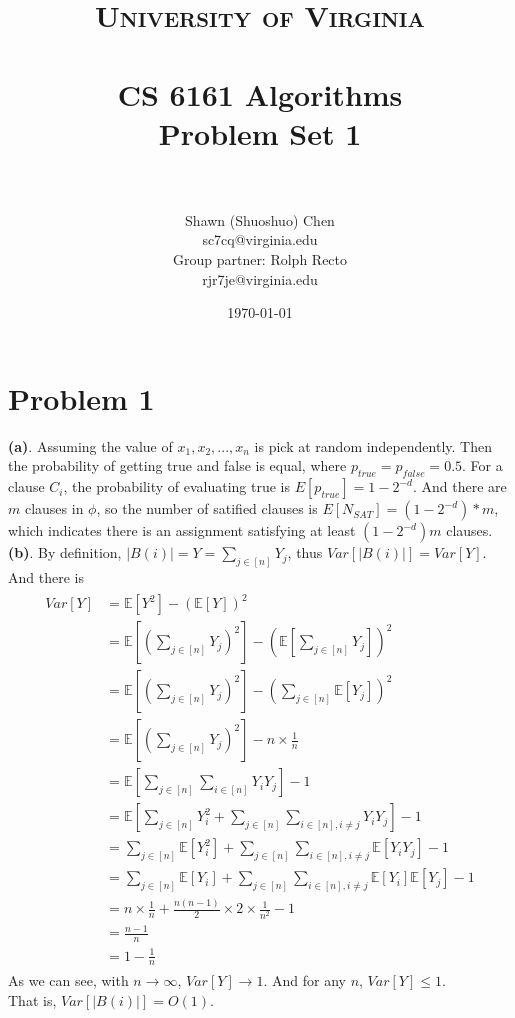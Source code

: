 \documentclass[titlepage, paper=a4, fontsize=11pt]{scrartcl} %
\title{	
\normalfont \normalsize 
\textsc{University of Virginia} \\ [25pt] %
\horrule{0.5pt} \\[0.4cm] %
\huge CS 6161 Algorithms \\
\huge Problem Set 1 \\ %
\horrule{2pt} \\[0.5cm] %
}
\author{Shawn (Shuoshuo) Chen\\sc7cq@virginia.edu\\Group partner: Rolph Recto\\ rjr7je@virginia.edu} %
\date{\normalsize\today} %
\numberwithin{equation}{section} %
\numberwithin{figure}{section} %
\numberwithin{table}{section} %
\begin{document}
\maketitle %


\section*{Problem 1}
\textbf{(a)}.
Assuming the value of ${x_1,x_2, ... ,x_n}$ is pick at random independently. Then the probability of getting true
and false is equal, where $p_{true} = p_{false} = 0.5$. For a clause $C_i$, the probability of evaluating true is
$E[p_{true}] = 1-2^{-d}$. And there are $m$ clauses in $\phi$, so the number of satified clauses is
$E[N_{SAT}] = (1-2^{-d}) * m$, which indicates there is an assignment satisfying at least $(1-2^{-d})m$ clauses.
\\

\textbf{(b)}. By definition, $|B(i)| = Y = \sum_{j \in [n]} Y_j$, thus $Var[|B(i)|] = Var[Y]$. And there is \\
\begin{align*} 
\begin{split}
Var[Y] &= \mathbb{E}[Y^2] - (\mathbb{E}[Y])^2 \\
&= \mathbb{E}[(\sum_{j \in [n]} Y_j)^2] - (\mathbb{E}[\sum_{j \in [n]} Y_j])^2 \\
&= \mathbb{E}[(\sum_{j \in [n]} Y_j)^2] - (\sum_{j \in [n]} \mathbb{E}[Y_j])^2 \\
&= \mathbb{E}[(\sum_{j \in [n]} Y_j)^2] - n \times \frac{1}{n} \\
&= \mathbb{E}[\sum_{j \in [n]}\sum_{i \in [n]} Y_iY_j] - 1 \\
&= \mathbb{E}[\sum_{j \in [n]} Y_i^2 + \sum_{j \in [n]}\sum_{i \in [n], i \neq j} Y_iY_j] - 1 \\
&= \sum_{j \in [n]}\mathbb{E}[Y_i^2] + \sum_{j \in [n]}\sum_{i \in [n], i \neq j}\mathbb{E}[Y_iY_j] -1 \\
&= \sum_{j \in [n]}\mathbb{E}[Y_i] + \sum_{j \in [n]}\sum_{i \in [n], i \neq j}\mathbb{E}[Y_i]\mathbb{E}[Y_j] -1 \\
&= n \times \frac{1}{n} + \frac{n(n-1)}{2} \times 2 \times \frac{1}{n^2} -1 \\
&= \frac{n-1}{n} \\
&= 1 - \frac{1}{n}
\end{split}					
\end{align*}
As we can see, with $n \to \infty$, $Var[Y] \to 1$. And for any $n$, $Var[Y] \leqslant 1$. \\
That is, $Var[|B(i)|] = O(1)$.
\\
\end{document}
